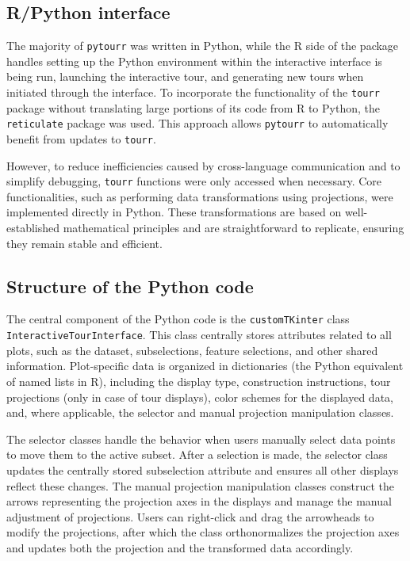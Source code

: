 \documentclass[article]{ajs}
\begin{document}
\subsection{R/Python interface}

The majority of \texttt{pytourr} was written in Python, while the R side of the package handles setting up the Python environment within the interactive interface is being run, launching the interactive tour, and generating new tours when initiated through the interface. To incorporate the functionality of the \texttt{tourr} package without translating large portions of its code from R to Python, the \texttt{reticulate} package was used. This approach allows \texttt{pytourr} to automatically benefit from updates to \texttt{tourr}.

However, to reduce inefficiencies caused by cross-language communication and to simplify debugging, \texttt{tourr} functions were only accessed when necessary. Core functionalities, such as performing data transformations using projections, were implemented directly in Python. These transformations are based on well-established mathematical principles and are straightforward to replicate, ensuring they remain stable and efficient.

\subsection{Structure of the Python code}

The central component of the Python code is the \texttt{customTKinter} class \texttt{InteractiveTourInterface}. This class centrally stores attributes related to all plots, such as the dataset, subselections, feature selections, and other shared information. Plot-specific data is organized in dictionaries (the Python equivalent of named lists in R), including the display type, construction instructions, tour projections (only in case of tour displays), color schemes for the displayed data, and, where applicable, the selector and manual projection manipulation classes.

The selector classes handle the behavior when users manually select data points to move them to the active subset. After a selection is made, the selector class updates the centrally stored subselection attribute and ensures all other displays reflect these changes. The manual projection manipulation classes construct the arrows representing the projection axes in the displays and manage the manual adjustment of projections. Users can right-click and drag the arrowheads to modify the projections, after which the class orthonormalizes the projection axes and updates both the projection and the transformed data accordingly.
\end{document}
